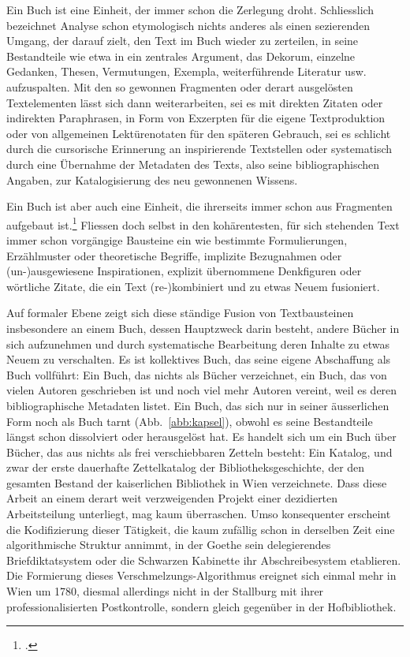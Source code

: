 \documentclass[a4paper,10pt]{article}
\begin{document}
Ein Buch ist eine Einheit, der immer schon die Zerlegung droht. Schliesslich bezeichnet Analyse schon etymologisch nichts anderes als einen sezierenden Umgang, der darauf zielt, den Text im Buch wieder zu zerteilen, in seine Bestandteile wie etwa in ein zentrales Argument, das Dekorum, einzelne Gedanken, Thesen, Vermutungen, Exempla, weiterführende Literatur usw. aufzuspalten. %
Mit den so gewonnen Fragmenten oder derart ausgelösten Textelementen lässt sich dann weiterarbeiten, sei es mit direkten Zitaten oder indirekten Paraphrasen, in Form von Exzerpten für die eigene Textproduktion oder von allgemeinen Lektürenotaten für den späteren Gebrauch, sei es schlicht durch die cursorische Erinnerung an inspirierende Textstellen oder systematisch durch eine Übernahme der Metadaten des Texts, also seine bibliographischen Angaben, zur Katalogisierung des neu gewonnenen Wissens. 
 
Ein Buch ist aber auch eine Einheit, die ihrerseits immer schon aus Fragmenten aufgebaut ist.\footcite[Zur Übersicht einer historischen Genese des Fragments als ästhetische Produktivkraft vgl.][]{fetscher:2001} Fliessen doch selbst in den kohärentesten, für sich stehenden Text immer schon vorgängige Bausteine ein wie bestimmte Formulierungen, Erzählmuster oder theoretische Begriffe, implizite Bezugnahmen oder (un-)ausgewiesene Inspirationen, explizit übernommene Denkfiguren oder wörtliche Zitate, die ein Text (re-)kombiniert und zu etwas Neuem fusioniert. 
 
Auf formaler Ebene zeigt sich diese ständige Fusion von Textbausteinen insbesondere an einem Buch, dessen Hauptzweck darin besteht, andere Bücher in sich aufzunehmen und durch systematische Bearbeitung deren Inhalte zu etwas Neuem zu verschalten. Es ist kollektives Buch, das seine eigene Abschaffung als Buch vollführt: Ein Buch, das nichts als Bücher verzeichnet, ein Buch, das von vielen Autoren geschrieben ist und noch viel mehr Autoren vereint, weil es deren bibliographische Metadaten listet. Ein Buch, das sich nur in seiner äusserlichen Form noch als Buch tarnt (Abb.~\ref{abb:kapsel}), obwohl es seine Bestandteile längst schon dissolviert oder herausgelöst hat. Es handelt sich um ein Buch über Bücher, das aus nichts als frei verschiebbaren Zetteln besteht: Ein Katalog, und zwar der erste dauerhafte Zettelkatalog der Bibliotheksgeschichte, der den gesamten Bestand der kaiserlichen Bibliothek in Wien verzeichnete. Dass diese Arbeit an einem derart weit verzweigenden Projekt einer dezidierten Arbeitsteilung unterliegt, mag kaum überraschen. Umso konsequenter erscheint die Kodifizierung dieser Tätigkeit, die kaum zufällig schon in derselben Zeit eine algorithmische Struktur annimmt, in der Goethe sein delegierendes Briefdiktatsystem oder die Schwarzen Kabinette ihr Abschreibesystem etablieren. Die Formierung dieses Verschmelzungs-Algorithmus ereignet sich einmal mehr in Wien um 1780, diesmal allerdings nicht in der Stallburg mit ihrer professionalisierten Postkontrolle, sondern gleich gegenüber in der Hofbibliothek.
\end{document}
